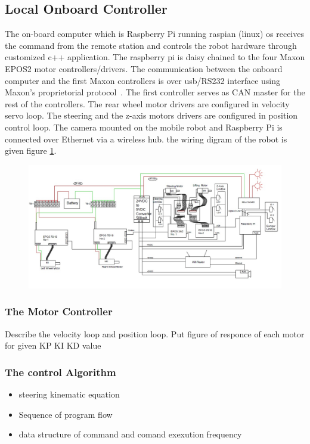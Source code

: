 \subsection{Local Onboard Controller}
The  on-board computer which is Raspberry Pi running raspian (linux) os receives the command from the remote station and controls the robot hardware through customized c++ application.
The raspberry pi  is daisy chained to the four Maxon EPOS2 motor controllers/drivers. The communication between the onboard computer and the first Maxon controllers is over usb/RS232 interface using Maxon's proprietorial protocol~\cite{maxonrs232}. The first controller serves as CAN master for the rest of the controllers. The rear wheel motor drivers are configured in velocity servo loop. The steering and the z-axis motors drivers are configured in position control loop.  The camera mounted on the mobile robot  and Raspberry Pi  is connected over Ethernet via a wireless hub. the wiring digram of the robot is given figure \ref {fig:wiring}.
\begin{figure}
	\includegraphics[width=\linewidth,keepaspectratio]{Chapter5/fig/RobotSideWiring}
	\label{fig:wiring} 
\end{figure} 
\subsubsection{The Motor Controller}
Describe the velocity loop and position loop. Put figure of  responce of each motor for given KP KI KD value
\subsubsection{The control Algorithm}
\begin{itemize}
\item steering kinematic equation
\item Sequence of program flow
\item data structure of command  and comand exexution frequency
\end{itemize}
